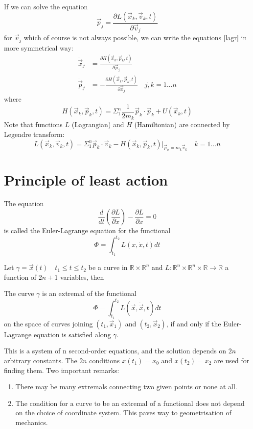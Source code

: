 If we can solve the equation 
\[ \vec p_j=\frac{\partial L(\vec x_k,\vec v_k,t)}
{\partial \vec v_j} \] 
for $ \vec v_j $
which of course is not always possible, we can write the equations \eqref{lagr}
in more symmetrical way:
\begin{equation}
   \label {ham}
   \begin{split}
        \dot \vec x_j&=\frac{\partial H(\vec x_k,\vec p_k,t)}{\partial \vec p_j}  \\ 
        \dot \vec p_j&= -\frac{\partial H(\vec x_k,\vec p_k,t)}{\partial \vec x_j}\quad j,k=1\ldots n    
   \end{split}
\end{equation}
where 
\begin{equation}
        H(\vec x_k,\vec p_k,t)=\Sigma_1^n \frac{1}{2 m_k} \vec p_k \cdot \vec p_k+U(\vec x_k,t) \label{ham3}
\end{equation}
Note that functions $L$ (Lagrangian) and $H$ (Hamiltonian) are connected by Legendre transform:
\begin{equation}
        L(\vec x_k,\vec v_k,t)=\Sigma_1^n  \vec p_k \cdot \vec v_k -H(\vec x_k,\vec p_k,t)|_{\vec p_k=m_k\vec v_k}
\quad k=1\ldots n \label {lagr-ham}
\end{equation}


\section{Principle of least action}
\label{cm:pla}

\begin{definition}
        The equation
        \[\frac{d}{d t}(\frac{\partial L}{\partial \dot x})-\frac{\partial L}{\partial  x}=0 \]
        is called the Euler-Lagrange equation for the functional
        \[\Phi=\int_{t_1}^{t_2} L(x,\dot x,t) dt \]
\end{definition}
Let \( \gamma= \vec x(t) \quad t_1 \le t \le t_2 \) be a curve  in  $\mathbb{R} \times \mathbb{R}^n$ and 
$L: \mathbb{R}^n \times \mathbb{R}^n \times \mathbb{R}\rightarrow \mathbb{R}$ a function of $2 n +1$
variables, then
\begin{theorem}
         The curve $\gamma$ is an extremal of the functional \[\Phi=\int_{t_1}^{t_2} L(\vec x,\dot \vec x,t) dt \]
        on the space of curves joining $(t_1, \vec x_1)$ and $(t_2,\vec x_2)$, if and only if the Euler-
Lagrange equation is satisfied along $\gamma$.
\end{theorem}
This is a system of n second-order equations, and the solution depends on
$2 n$ arbitrary constants. The $2 n$ conditions $x(t_1) = x_0$ and $x(t_2) = x_2$ are used
for finding them.
Two important remarks:
\begin{enumerate}
        \item There may be many extremals connecting two
given points or none at all.
\item The condition for a curve  to be an extremal of a functional does not depend
on the choice of coordinate system. This paves way to geometrisation of mechanics.
\end{enumerate}


